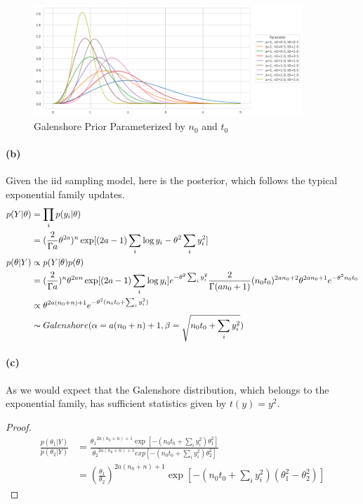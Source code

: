 \documentclass[11pt, letterpaper]{article}
\begin{document}
\begin{figure}[!h]
  \centering
  \includegraphics[width=0.9\textwidth]{1.a.png}
  \captionsetup{justification=centering}
  \caption{Galenshore Prior Parameterized by $n_0$ and $t_0$}
\end{figure}

\paragraph{(b)}
Given the iid sampling model, here is the posterior, which follows the typical exponential family updates.
\begin{align*}
    p(Y|\theta)
        &= \prod_i p(y_i|\theta) \\
        &= (\frac{2}{\Gamma{a}} \theta^{2a})^n \exp[(2a-1) \sum_i \log y_i - \theta^2 \sum_i y_i^2] \\
    p(\theta|Y) &\propto p(Y|\theta) p(\theta) \\
        &=
            (\frac{2}{\Gamma{a}})^n \theta^{2an} \exp[(2a-1) \sum_i \log y_i] e^{- \theta^2 \sum_i y_i^2}
            \frac{2}{\Gamma(an_0 + 1)} (n_0 t_0)^{2a n_0 + 2} \theta^{2an_0+1} e^{-\theta^2 n_0 t_0} \\
        &\propto \theta^{2a(n_0+n)+1} e^{-\theta^2(n_0 t_0 + \sum_i y_i^2)} \\
        &\thicksim Galenshore(\alpha = a (n_0+n) + 1, \beta = \sqrt{n_0 t_0 + \sum_i y_i^2})
\end{align*}

\paragraph{(c)}
As we would expect that the Galenshore distribution, which belongs to the exponential family, has sufficient statistics given by $t(y) = y^2$.
\begin{proof}
\begin{align*}
    \frac{p(\theta_1|Y)}{p(\theta_2|Y)}
        &= \frac{{\theta_1}^{2a(n_0+n)+1} \exp[-(n_0t_0+\sum_i y_i^2)\theta_1^2]}{{\theta_2}^{2a(n_0+n)+1} exp[-(n_0t_0+\sum_i y_i^2)\theta_2^2]} \\
        &= ({\frac{\theta_1}{\theta_2}})^{2a(n_0+n)+1} \exp[-(n_0t_0+\sum_i y_i^2)(\theta_1^2 - \theta_2^2)]
\end{align*}
\end{proof}
\end{document}
